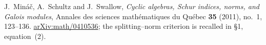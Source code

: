 J.~Min\'{a}\v{c}, A.~Schultz and J.~Swallow,
\emph{Cyclic algebras, Schur indices, norms, and Galois modules},
Annales des sciences math\'{e}matiques du Qu\'{e}bec \textbf{35} (2011), no.~1, 123--136.
\href{https://arxiv.org/abs/math/0410536}{arXiv:math/0410536};
the splitting--norm criterion is recalled in \S1, equation~(2).
